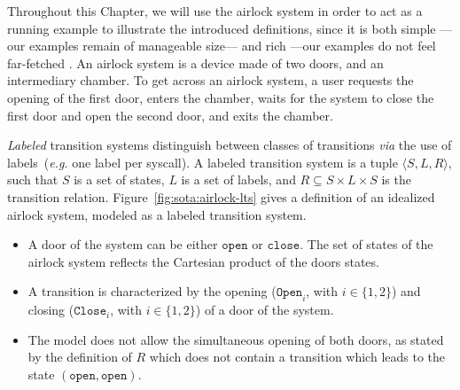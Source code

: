 
Throughout this Chapter, we will use the airlock system in order to act as a
running example to illustrate the introduced definitions, since it is both
simple ---our examples remain of manageable size--- and rich ---our examples do
not feel far-fetched .
%
An airlock system is a device made of two doors, and an intermediary chamber.
%
To get across an airlock system, a user requests the opening of the first door,
enters the chamber, waits for the system to close the first door and open the
second door, and exits the chamber.

\begin{example}
  \label{example:sota:airlocklts}

  \emph{Labeled} transition systems distinguish between classes of transitions
  \emph{via} the use of labels\,\cite{loiseaux1995lts} (\emph{e.g.} one label
  per syscall).
%
  A labeled transition system is a tuple \( \langle S, L, R \rangle \), such
  that \( S \) is a set of states, \( L \) is a set of labels, and
  \( R \subseteq S \times L \times S \) is the transition relation.
  Figure~\ref{fig:sota:airlock-lts} gives a definition of an idealized airlock
  system, modeled as a labeled transition system.

  \begin{itemize}
  \item A door of the system can be either \( \mathtt{open} \) or
    \( \mathtt{close} \).
    The set of states of the airlock system reflects the Cartesian product of
    the doors states.
  \item A transition is characterized by the opening (\( \mathtt{Open}_i\), with
    \( i \in \{1, 2\} \)) and closing (\( \mathtt{Close}_i \), with
    \( i \in \{1, 2\} \)) of a door of the system.
  \item The model does not allow the simultaneous opening of both doors, as
    stated by the definition of \( R \) which does not contain a transition
    which leads to the state \( (\mathtt{open}, \mathtt{open}) \).
  \end{itemize}
\end{example}


